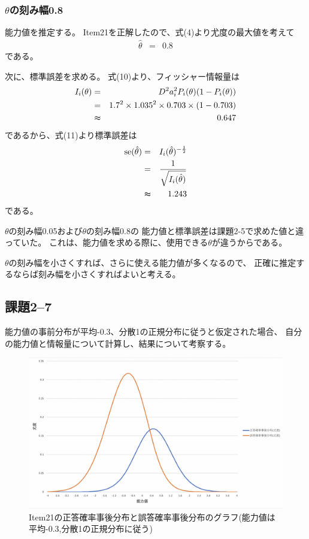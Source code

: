 \documentclass[12pt]{jarticle}
\begin{document}
\subsubsection*{$\theta$の刻み幅0.8}
能力値を推定する。
Item21を正解したので、式(4)より尤度の最大値を考えて
\begin{eqnarray}
    \hat{\theta}&=&0.8 \nonumber
\end{eqnarray}
である。

次に、標準誤差を求める。
式(10)より、フィッシャー情報量は
\begin{eqnarray}
    I_i(\theta)&=&D^2a_i^2 P_i(\theta)(1-P_i(\theta)) \nonumber\\
    &=&1.7^2 \times 1.035^2\times 0.703\times (1-0.703) \nonumber\\
    &\thickapprox& 0.647 \nonumber
\end{eqnarray}
であるから、式(11)より標準誤差は
\begin{eqnarray}
    {\rm se}(\hat{\theta})&=&I_i(\hat{\theta})^{-\frac{1}{2}} \nonumber\\
    &=&\frac{1}{\sqrt{I_i(\hat{\theta})}}\nonumber\\
    &\thickapprox&1.243\nonumber
\end{eqnarray}
である。

$\theta$の刻み幅0.05および$\theta$の刻み幅0.8の
能力値と標準誤差は課題2-5で求めた値と違っていた。
これは、能力値を求める際に、使用できる$\theta$が違うからである。

$\theta$の刻み幅を小さくすれば、さらに使える能力値が多くなるので、
正確に推定するならば刻み幅を小さくすればよいと考える。

\clearpage
\subsection{課題2–7}
\begin{shadebox}
    能力値の事前分布が平均-0.3、分散1の正規分布に従うと仮定された場合、
    自分の能力値と情報量について計算し、結果について考察する。
\end{shadebox}
\begin{figure}[h]
    \begin{center}
        \includegraphics[scale=0.3]{kadai5_2_8.png}
    \end{center}
    \caption{Item21の正答確率事後分布と誤答確率事後分布のグラフ(能力値は平均-0.3,分散1の正規分布に従う)}
\end{figure}
\end{document}
